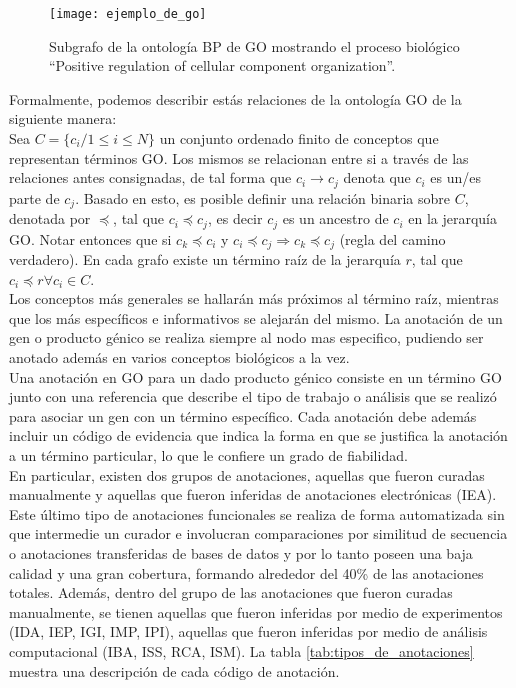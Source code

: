\begin{figure}[h]
    \centering
    \texttt{[image: ejemplo\_de\_go]}
    \caption{Subgrafo de la ontología BP de GO mostrando el proceso biológico ``Positive regulation of cellular component organization''.}
    \label{fig:ejemplo_de_go}
\end{figure}
Formalmente, podemos describir estás relaciones de la ontología GO de la siguiente manera:\\
Sea $C=\{c_i / 1\leq i \leq N\}$ un conjunto ordenado finito de conceptos que representan términos GO. Los mismos se relacionan entre si a través de las relaciones antes consignadas, de tal forma que $c_i \rightarrow c_j$ denota que $c_i$ es un/es parte de $c_j$. Basado en esto, es posible definir una relación binaria sobre $C$, denotada por $\preceq$, tal que $c_i \preceq c_j$, es decir $c_j$ es un ancestro de $c_i$ en la jerarquía GO. Notar entonces que si $c_k \preceq c_i$ y $c_i \preceq c_j \Rightarrow c_k \preceq c_j$ (regla del camino verdadero). En cada grafo existe un término raíz de la jerarquía $r$, tal que $c_i \preceq r \forall c_i \in C$.\\
Los conceptos más generales se hallarán más próximos al término raíz, mientras que los más específicos e informativos se alejarán del mismo. La anotación de un gen o producto génico se realiza siempre al nodo mas especifico, pudiendo ser anotado además en varios conceptos biológicos a la vez.\\
Una anotación en GO para un dado producto génico consiste en un término GO junto con una referencia que describe el tipo de trabajo o análisis que se realizó para asociar un gen con un término específico. Cada anotación debe además incluir un código de evidencia que indica la forma en que se justifica la anotación a un término particular, lo que le confiere un grado de fiabilidad.\\En particular, existen dos grupos de anotaciones, aquellas que fueron curadas manualmente y aquellas que fueron inferidas de anotaciones electrónicas (IEA). Este último tipo de anotaciones funcionales se realiza de forma automatizada sin que intermedie un curador e involucran comparaciones por similitud de secuencia o anotaciones transferidas de bases de datos y por lo tanto poseen una baja calidad y una gran cobertura, formando alrededor del 40\% de las anotaciones totales. Además, dentro del grupo de las anotaciones que fueron curadas manualmente, se tienen aquellas que fueron inferidas por medio de experimentos (IDA, IEP, IGI, IMP, IPI), aquellas que fueron inferidas por medio de análisis computacional (IBA, ISS, RCA, ISM). La tabla \ref{tab:tipos_de_anotaciones} muestra una descripción de cada código de anotación.\\
